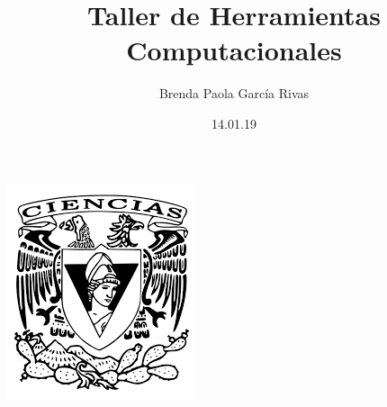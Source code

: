 \documentclass[letterpaper, 12pt, oneside]{article}
\title{Taller de Herramientas Computacionales}
\author{Brenda Paola García Rivas}
\date{14.01.19}
\begin{document}
	\maketitle
	\begin{center}
		\includegraphics[scale=0.40]{1.png}
	\end{center}
	\newpage
	
\end{document}
